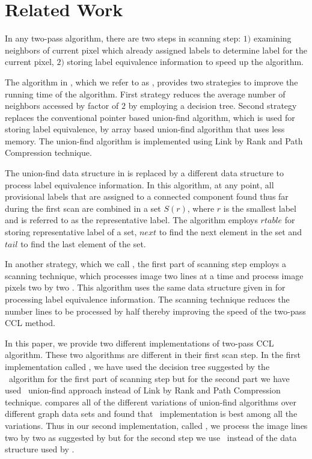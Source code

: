\section{Related Work}
\label{sec:related_works}

In any two-pass algorithm, there are two steps in scanning step: $1)$ examining neighbors of current pixel which already
assigned labels to determine label for the current pixel, $2)$ storing label equivalence information to speed up the algorithm. 

The algorithm in \cite{Wu2009_LRPC}, which we refer to as \lrpc, provides two strategies to improve the running time of the algorithm.
First strategy reduces the average number of neighbors accessed by factor of $2$ by employing a decision tree.
Second strategy replaces the conventional pointer based union-find algorithm, which is used for storing label equivalence,
by array based union-find algorithm that uses less memory. The union-find algorithm is implemented using
Link by Rank and Path Compression technique. %

The union-find data structure in \cite{He2008_Run} is replaced by a different data structure to process label equivalence
information. In this algorithm, at any point, all provisional labels that are assigned to a connected 
component found thus far during the first scan are combined in a set $S(r)$, where $r$ is the smallest label and is 
referred to as the representative label. The algorithm employs $rtable$ for storing representative label of a set, $next$ to 
find the next element in the set and $tail$ to find the last element of the set.


In another strategy, which we call \arun, the first part of scanning step employs a scanning technique, which processes image two lines 
at a time and process image pixels two by two \cite{He2012_ARun}. This algorithm uses the same data structure given in
\cite{He2008_Run} for processing label equivalence information. The scanning technique reduces the number lines to be
processed by half thereby improving the speed of the two-pass CCL method. %

In this paper, we provide two different implementations of two-pass CCL algorithm. These two algorithms are different in their
first scan step. In the first implementation called \remsp, we have used the 
decision tree suggested by the \lrpc\ algorithm for the first part of scanning step but for the second part we have used
\rems\ union-find approach instead of Link by Rank and Path Compression technique.
\cite{Patwary2010_RemSP} compares all of the different variations of union-find algorithms over different graph data sets and found that
\rems\ implementation is best among all the variations. Thus in our second implementation, called \aremsp, we process the image lines
two by two as suggested by \cite{He2012_ARun} but for the second step
we use \remsp\ instead of the data structure used by \cite{He2012_ARun}.

